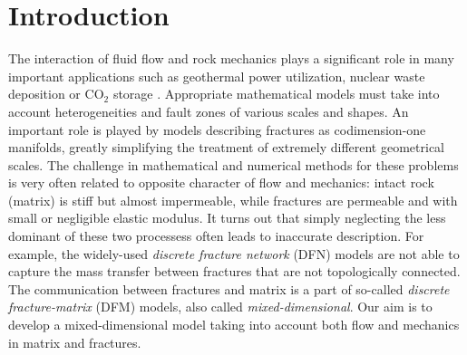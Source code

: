 \documentclass[a4paper]{article}
\numberwithin{equation}{section}
\begin{document}
\section{Introduction}



The interaction of fluid flow and rock mechanics plays a significant role in many important applications such as geothermal power utilization, nuclear waste deposition or CO${}_2$ storage \cite{rutqvist2003role}.
Appropriate mathematical models must take into account heterogeneities and fault zones of various scales and shapes.
An important role is played by models describing fractures as codimension-one manifolds, greatly simplifying the treatment of extremely different geometrical scales.
The challenge in mathematical and numerical methods for these problems is very often related to opposite character of flow and mechanics: intact rock (matrix) is stiff but almost impermeable, while fractures are permeable and with small or negligible elastic modulus.
It turns out that simply neglecting the less dominant of these two processess often leads to inaccurate description.
For example, the widely-used \textit{discrete fracture network} (DFN) models are not able to capture the mass transfer between fractures that are not topologically connected.
The communication between fractures and matrix is a part of so-called \textit{discrete fracture-matrix} (DFM) models, also called \textit{mixed-dimensional}.
Our aim is to develop a mixed-dimensional model taking into account both flow and mechanics in matrix and fractures.
\end{document}
